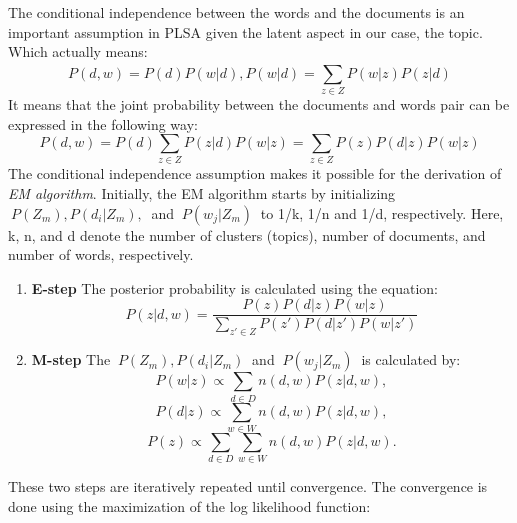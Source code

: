 \documentclass[12pt]{report}
\begin{document}
        The conditional independence between the words and the documents is an important assumption in PLSA given the latent aspect 
        in our case, the topic. Which actually means:
        \begin{equation}P(d, w) = P(d) P(w|d), P(w|d) = \sum_{z \in Z}^{} P(w|z) P(z|d) \end{equation}
        It means that the joint probability between the documents and words pair can be expressed in the following way:
        \begin{equation}\label{eq4}
            P(d, w) = P(d) \sum_{z \in Z} P(z|d) P(w|z) = \sum_{z \in Z} P(z) P(d|z) P(w|z) 
        \end{equation}
        The conditional independence assumption makes it possible for the derivation of \emph{EM algorithm}.
        Initially, the EM algorithm starts by initializing $~{P(Z_m), P(d_i|Z_m),}~$ and $~{P(w_j|Z_m)}~$ to 1/k, 1/n and 1/d, respectively.
        Here, k, n, and d denote the number of clusters (topics), number of documents, and number of words, respectively. 
        \begin{enumerate}
            \item \textbf{E-step} The posterior probability is calculated using the equation:
                    \begin{equation}
                        P(z|d, w) = \frac{P(z) P(d|z) P(w|z)}{\sum_{z' \in Z} P(z') P(d|z') P(w|z')}
                    \end{equation}
            \item \textbf{M-step} The $~{P(Z_m), P(d_i|Z_m)}~$ and $~{P(w_j|Z_m)}~$ is calculated by:
                    \begin{equation}
                        P(w|z) \propto \sum_{d \in D} n(d, w) P(z|d, w),
                    \end{equation}
                    \begin{equation}
                        P(d|z) \propto \sum_{w \in W} n(d, w) P(z|d, w),
                    \end{equation}
                    \begin{equation}
                        P(z) \propto \sum_{d \in D} \sum_{w \in W} n(d, w) P(z|d, w).
                    \end{equation}
        \end{enumerate}
        These two steps are iteratively repeated until convergence. The convergence is done using the maximization of the log likelihood 
        function:
        
\end{document}
